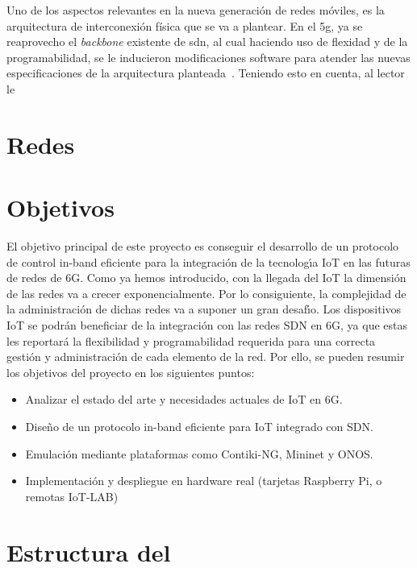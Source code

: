 Uno de los aspectos relevantes en la nueva generación de redes móviles, es la arquitectura de interconexión física que se va a plantear. En el \gls{5g}, ya se reaprovecho el \textit{backbone} existente de \gls{sdn}, al cual haciendo uso de flexidad y de la programabilidad,  se le inducieron modificaciones software para atender las nuevas especificaciones de la arquitectura planteada~\cite{Li2018}. Teniendo esto en cuenta, al lector le


\section{Redes }
\label{sec:6gIoT_sdn}


\section{Objetivos}
\label{sec:obj}

El objetivo principal de este proyecto es conseguir el desarrollo de un protocolo de control in-band eficiente
para la integración de la tecnologı́a IoT en las futuras de redes de 6G. Como ya hemos introducido, con la
llegada del IoT la dimensión de las redes va a crecer exponencialmente. Por lo consiguiente, la complejidad
de la administración de dichas redes va a suponer un gran desafı́o. Los dispositivos IoT se podrán beneficiar
de la integración con las redes SDN en 6G, ya que estas les reportará la flexibilidad y programabilidad
requerida para una correcta gestión y administración de cada elemento de la red. Por ello, se pueden resumir
los objetivos del proyecto en los siguientes puntos:

\begin{itemize}
    \item Analizar el estado del arte y necesidades actuales de IoT en 6G.
    \item Diseño de un protocolo in-band eficiente para IoT integrado con SDN.
    \item Emulación mediante plataformas como Contiki-NG, Mininet y ONOS.
    \item Implementación y despliegue en hardware real (tarjetas Raspberry Pi, o remotas IoT-LAB)
\end{itemize}





\section{Estructura del }
\label{sec:structure}



